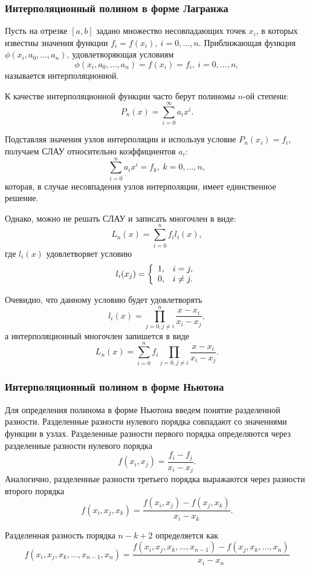 \documentclass[a4paper,12pt]{article}
\begin{document}
\subsubsection{Интерполяционный полином в форме Лагранжа}
Пусть на отрезке $[a, b]$ задано множество несовпадающих точек $x_i$,
в которых известны значения функции $f_i = f(x_i),\ i = 0, \ldots, n$.
Приближающая функция $\phi(x_i, a_0, \ldots, a_n)$, удовлетворяющая
условиям
$$
\phi(x_i, a_0, \ldots, a_n) = f(x_i) = f_i,\ i = 0, \ldots, n,
$$
называется интерполяционной.

К качестве интерполяционной функции часто берут полиномы $n$-ой степени:
$$
P_n(x) = \sum_{i = 0}^{\infty} a_i x^{i}.
$$

Подставляя значения узлов интерполяции и используя условие $P_n(x_i) = f_i$,
получаем СЛАУ относительно коэффициентов $a_i$:
$$
\sum_{i = 0}^{n} a_i x^{i} = f_k,\ k = 0, \ldots, n,
$$
которая, в случае несовпадения узлов интерполяции, имеет единственное решение.

Однако, можно не решать СЛАУ и записать многочлен в виде:
$$
L_n(x) = \sum_{i = 0}^{n} f_i l_i(x),
$$
где $l_i(x)$ удовлетворяет условию
$$
l_i(x_j) =
\left\{
    \begin{array}{l l }
        1, & i = j, \\
        0, & i \not = j.
    \end{array}
    \right.
$$

Очевидно, что данному условию будет удовлетворять
$$
l_i(x) = \prod_{j = 0, j \not = i}^{n} \frac{x - x_i}{x_i - x_j},
$$
а интерполяционный многочлен запишется в виде
$$
L_n(x) = \sum_{i = 0}^{n} f_i \prod_{j = 0, j \not = i} \frac{x - x_i}{x_i - x_j}.
$$

\subsubsection{Интерполяционный полином в форме Ньютона}
Для определения полинома в форме Ньютона введем понятие разделенной разности.
Разделенные разности нулевого порядка совпадают со значениями функции в узлах.
Разделенные разности первого порядка определяются через разделенные разности
нулевого порядка
$$
f(x_i, x_j) = \frac{f_i - f_j}{x_i - x_j}.
$$
Аналогично, разделенные разности третьего порядка выражаются через разности
второго порядка
$$
f(x_i, x_j, x_k) = \frac{f(x_i, x_j) - f(x_j, x_k)}{x_i - x_k}.
$$

Разделенная разность порядка $n - k + 2$ определяется как
$$
f(x_i, x_j, x_k, \ldots, x_{n - 1}, x_n) = \frac{f(x_i, x_j, x_k, \ldots, x_{n - 1}) - f(x_j, x_k, \ldots, x_n)}
{x_i - x_n}
$$
\end{document}
